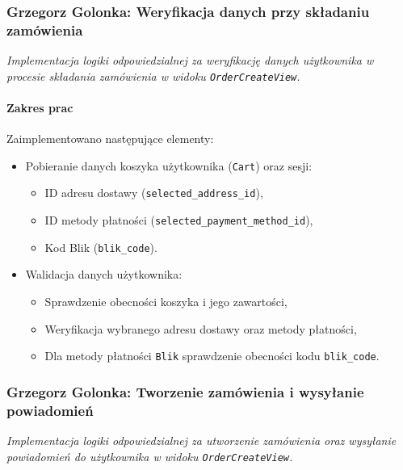 \documentclass[12pt,a4paper,oneside]{article}
\theoremstyle{definition}
\numberwithin{equation}{section}
\begin{document}
%
%
\subsubsection{Grzegorz Golonka: Weryfikacja danych przy składaniu zamówienia}
\label{section:1.3.26}
\textit{
Implementacja logiki odpowiedzialnej za weryfikację danych użytkownika w procesie składania zamówienia w widoku \texttt{OrderCreateView}.
}

\paragraph{Zakres prac}
Zaimplementowano następujące elementy:
\begin{itemize}
    \item Pobieranie danych koszyka użytkownika (\texttt{Cart}) oraz sesji:
    \begin{itemize}
        \item ID adresu dostawy (\texttt{selected\_address\_id}),
        \item ID metody płatności (\texttt{selected\_payment\_method\_id}),
        \item Kod Blik (\texttt{blik\_code}).
    \end{itemize}
    \item Walidacja danych użytkownika:
    \begin{itemize}
        \item Sprawdzenie obecności koszyka i jego zawartości,
        \item Weryfikacja wybranego adresu dostawy oraz metody płatności,
        \item Dla metody płatności \texttt{Blik} sprawdzenie obecności kodu \texttt{blik\_code}.
    \end{itemize}
\end{itemize}
%
%
\subsubsection{Grzegorz Golonka: Tworzenie zamówienia i wysyłanie powiadomień}
\label{section:1.3.27}
\textit{
Implementacja logiki odpowiedzialnej za utworzenie zamówienia oraz wysyłanie powiadomień do użytkownika w widoku \texttt{OrderCreateView}.
}
\end{document}
